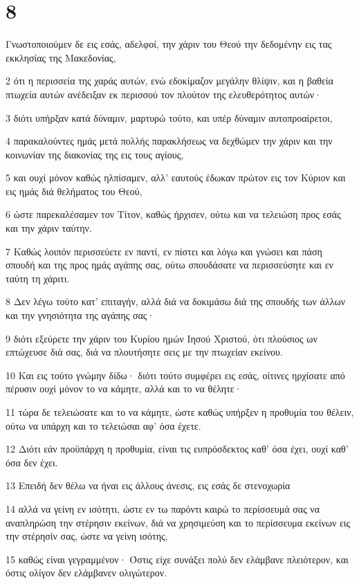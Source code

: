 \chapter{8}

\par Γνωστοποιούμεν δε εις εσάς, αδελφοί, την χάριν του Θεού την δεδομένην εις τας εκκλησίας της Μακεδονίας,
\par 2 ότι η περισσεία της χαράς αυτών, ενώ εδοκίμαζον μεγάλην θλίψιν, και η βαθεία πτωχεία αυτών ανέδειξαν εκ περισσού τον πλούτον της ελευθερότητος αυτών·
\par 3 διότι υπήρξαν κατά δύναμιν, μαρτυρώ τούτο, και υπέρ δύναμιν αυτοπροαίρετοι,
\par 4 παρακαλούντες ημάς μετά πολλής παρακλήσεως να δεχθώμεν την χάριν και την κοινωνίαν της διακονίας της εις τους αγίους,
\par 5 και ουχί μόνον καθώς ηλπίσαμεν, αλλ' εαυτούς έδωκαν πρώτον εις τον Κύριον και εις ημάς διά θελήματος του Θεού,
\par 6 ώστε παρεκαλέσαμεν τον Τίτον, καθώς ήρχισεν, ούτω και να τελειώση προς εσάς και την χάριν ταύτην.
\par 7 Καθώς λοιπόν περισσεύετε εν παντί, εν πίστει και λόγω και γνώσει και πάση σπουδή και της προς ημάς αγάπης σας, ούτω σπουδάσατε να περισσεύσητε και εν ταύτη τη χάριτι.
\par 8 Δεν λέγω τούτο κατ' επιταγήν, αλλά διά να δοκιμάσω διά της σπουδής των άλλων και την γνησιότητα της αγάπης σας·
\par 9 διότι εξεύρετε την χάριν του Κυρίου ημών Ιησού Χριστού, ότι πλούσιος ων επτώχευσε διά σας, διά να πλουτήσητε σεις με την πτωχείαν εκείνου.
\par 10 Και εις τούτο γνώμην δίδω· διότι τούτο συμφέρει εις εσάς, οίτινες ηρχίσατε από πέρυσιν ουχί μόνον το να κάμητε, αλλά και το να θέλητε·
\par 11 τώρα δε τελειώσατε και το να κάμητε, ώστε καθώς υπήρξεν η προθυμία του θέλειν, ούτω να υπάρχη και το τελειώσαι αφ' όσα έχετε.
\par 12 Διότι εάν προϋπάρχη η προθυμία, είναι τις ευπρόσδεκτος καθ' όσα έχει, ουχί καθ' όσα δεν έχει.
\par 13 Επειδή δεν θέλω να ήναι εις άλλους άνεσις, εις εσάς δε στενοχωρία
\par 14 αλλά να γείνη εν ισότητι, ώστε εν τω παρόντι καιρώ το περίσσευμά σας να αναπληρώση την στέρησιν εκείνων, διά να χρησιμεύση και το περίσσευμα εκείνων εις την στέρησίν σας, ώστε να γείνη ισότης,
\par 15 καθώς είναι γεγραμμένον· Όστις είχε συνάξει πολύ δεν ελάμβανε πλειότερον, και όστις ολίγον δεν ελάμβανεν ολιγώτερον.
